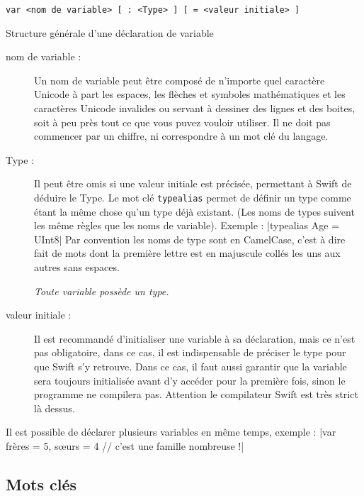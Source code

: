 \begin{listing}[h]
\begin{verbatim}
var <nom de variable> [ : <Type> ] [ = <valeur initiale> ]
\end{verbatim}
\caption{Structure générale d'une déclaration de variable}
\end{listing}

\begin{description}

\item[nom de variable :]
Un nom de variable peut être composé de n'importe quel caractère Unicode
à part les espaces, les flèches et symboles mathématiques et les
caractères Unicode invalides ou servant à dessiner des lignes et des boites,
soit à peu près tout ce que vous puvez vouloir utiliser.
Il ne doit pas commencer par un chiffre, ni correspondre à un mot clé du langage.


\item[Type :] Il peut être omis si une valeur initiale est précisée,
permettant à Swift de déduire le Type.
Le mot clé \texttt{typealias} permet de définir un type
comme étant la même chose qu'un type déjà existant.
(Les noms de types suivent les même règles que les noms de variable).
Exemple :
|typealias Age = UInt8|
Par convention les noms de type sont en CamelCase,
c'est à dire fait de mots dont la première lettre est en majuscule
collés les uns aux autres sans espaces.

\emph{Toute variable possède un type.}

\item[valeur initiale :]
Il est recommandé d'initialiser une variable à sa déclaration,
mais ce n'est pas obligatoire,
dans ce cas, il est indispensable de préciser le type pour que Swift s'y retrouve. 
Dans ce cas, il faut aussi garantir que la variable sera toujours initialisée
avant d'y accéder pour la première fois, sinon le programme ne compilera pas.
Attention le compilateur Swift est très strict là dessus.
\end{description}

Il est possible de déclarer plusieurs variables en même temps, exemple :
|var frères = 5, sœurs = 4 // c'est une famille nombreuse !|
\subsection{Mots clés}

